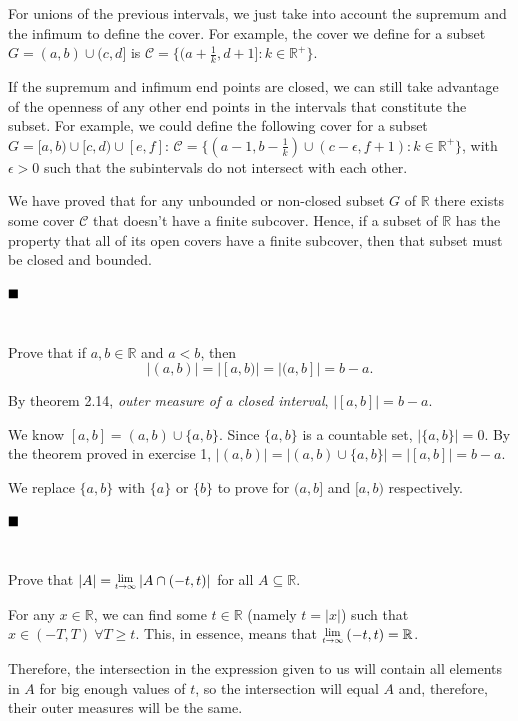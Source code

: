 \documentclass[11pt, a4paper, tikz]{article}
\newcommand{\centsection}[1]{
	\section*{\centering{#1}}
}
\renewcommand{\qed}{\hfill\blacksquare}
\newcommand{\Lim}[1]{\raisebox{0.5ex}{\scalebox{0.8}{$\displaystyle \lim_{#1}\;$}}}
\newcommand{\reals}{
	\ensuremath{\mathbb{R}}
}
\newcommand{\cover}[1]{
	\ensuremath{\mathcal{#1}}
}
\begin{document}
	For unions of the previous intervals, we just take into account the supremum and the infimum to define the cover. For example, the cover we define for a subset $G=(a,b)\cup(c,d]$ is $\cover{C} = \{(a+\frac{1}{k}, d+1]:k\in\reals^+\}$.
	
	If the supremum and infimum end points are closed, we can still take advantage of the openness of any other end points in the intervals that constitute the subset. For example, we could define the following cover for a subset $G=[a,b)\cup[c,d)\cup[e,f]$: $\cover{C}=\{(a-1,b-\frac{1}{k})\cup(c-\epsilon,f+1):k\in\reals^+\}$, with $\epsilon>0$ such that the subintervals do not intersect with each other.
	
	We have proved that for any unbounded or non-closed subset $G$ of $\reals$ there exists some cover $\cover{C}$ that doesn't have a finite subcover. Hence, if a subset of $\reals$ has the property that all of its open covers have a finite subcover, then that subset must be closed and bounded.
	
	$\qed$
	
	\centsection{Exercise 6}
	
	\begin{formulationBox}
		Prove that if $a,b\in\reals$ and $a<b$, then \[|(a,b)| = |[a,b)| = |(a,b]| = b-a.\]
	\end{formulationBox}
	
	By theorem 2.14, \textit{outer measure of a closed interval}, $|[a,b]| = b-a$.
	
	We know $[a,b] = (a,b)\cup\{a,b\}$. Since $\{a,b\}$ is a countable set, $|\{a,b\}| = 0$. By the theorem proved in exercise 1, $|(a,b)| = |(a,b)\cup\{a,b\}| = |[a,b]| = b-a$.
	
	We replace $\{a,b\}$ with $\{a\}$ or $\{b\}$ to prove for $(a,b]$ and $[a,b)$ respectively.
	
	$\qed$
	
	\centsection{Exercise 9}
	
	\begin{formulationBox}
		Prove that $|A| = \Lim{t\rightarrow\infty}|A\cap(-t,t)|$ for all $A\subseteq\reals$.
	\end{formulationBox}
	
	For any $x\in\reals$, we can find some $t\in\reals$ (namely $t=|x|$) such that $x\in(-T,T)\ \forall T\geq t$. This, in essence, means that $\Lim{t\rightarrow\infty}(-t,t) = \reals$.
	
	Therefore, the intersection in the expression given to us will contain all elements in $A$ for big enough values of $t$, so the intersection will equal $A$ and, therefore, their outer measures will be the same.
	
\end{document}
